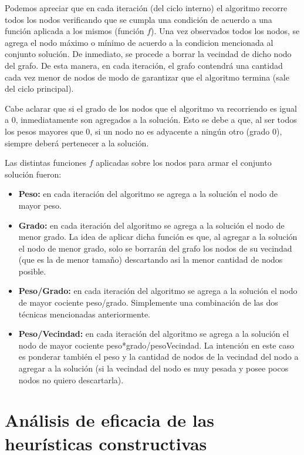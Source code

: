 \documentclass[a4paper,11pt] {article}
\begin{document}
Podemos apreciar que en cada iteraci\'on (del ciclo interno) el algoritmo recorre todos los nodos verificando que se cumpla una condici\'on de acuerdo a una funci\'on aplicada a los mismos (funci\'on $f$). Una vez observados todos los nodos, se agrega el nodo m\'aximo o m\'inimo de acuerdo a la condicion mencionada al conjunto soluci\'on. De inmediato, se procede a borrar la vecindad de dicho nodo del grafo. De esta manera, en cada iteraci\'on, el grafo contendr\'a una cantidad cada vez menor de nodos de modo de garantizar que el algoritmo termina (sale del ciclo principal).

Cabe aclarar que si el grado de los nodos que el algoritmo va recorriendo es igual a 0, inmediatamente son agregados a la soluci\'on. Esto se debe a que, al ser todos los pesos mayores que 0, si un nodo no es adyacente a ning\'un otro (grado 0), siempre deber\'a pertenecer a la soluci\'on.

Las distintas funciones $f$ aplicadas sobre los nodos para armar el conjunto soluci\'on fueron:

\begin{itemize}
\item \textbf{Peso:} en cada iteraci\'on del algoritmo se agrega a la soluci\'on el nodo de mayor peso.
\item \textbf{Grado:} en cada iteraci\'on del algoritmo se agrega a la soluci\'on el nodo de menor grado. La idea de aplicar dicha funci\'on es que, al agregar a la soluci\'on el nodo de menor grado, solo se borrar\'an del grafo los nodos de su vecindad (que es la de menor tama\~{n}o) descartando asi la menor cantidad de nodos posible.
\item \textbf{Peso/Grado:} en cada iteraci\'on del algoritmo se agrega a la soluci\'on el nodo de mayor cociente peso/grado. Simplemente una combinaci\'on de las dos t\'ecnicas mencionadas anteriormente.
\item \textbf{Peso/Vecindad:} en cada iteraci\'on del algoritmo se agrega a la soluci\'on el nodo de mayor cociente peso*grado/pesoVecindad. La intenci\'on en este caso es ponderar tambi\'en el peso y la cantidad de nodos de la vecindad del nodo a agregar a la soluci\'on (si la vecindad del nodo es muy pesada y posee pocos nodos no quiero descartarla).
\end{itemize}

\section*{An\'alisis de eficacia de las heur\'isticas constructivas}
\end{document}

